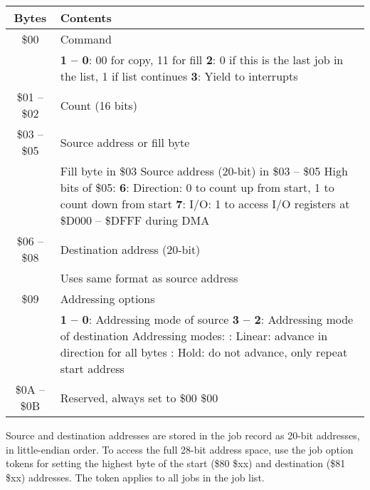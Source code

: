 \begin{center}
\begin{tabular}{|c|p{6cm}|}
\hline
{\bf Bytes} & {\bf Contents} \\
\hline

\$00 & Command \\
& {\bf 1 -- 0}: 00 for copy, 11 for fill \newline
{\bf 2}: 0 if this is the last job in the list, 1 if list continues \newline
{\bf 3}: Yield to interrupts \\
\hline

\$01 -- \$02 & Count (16 bits) \\
\hline

\$03 -- \$05 & Source address or fill byte \\
& Fill byte in \$03 \newline
Source address (20-bit) in \$03 -- \$05 \newline
High bits of \$05: \newline
{\bf 6}: Direction: 0 to count up from start, 1 to count down from start \newline
{\bf 7}: I/O: 1 to access I/O registers at \$D000 -- \$DFFF during DMA \\
\hline

\$06 -- \$08 & Destination address (20-bit) \\
& Uses same format as source address \\
\hline

\$09 & Addressing options \\
& {\bf 1 -- 0}: Addressing mode of source \newline
{\bf 3 -- 2}: Addressing mode of destination \newline
Addressing modes: \newline
00: Linear: advance in direction for all bytes \newline
10: Hold: do not advance, only repeat start address \\
\hline

\$0A -- \$0B & Reserved, always set to \$00 \$00 \\
\hline

\end{tabular}
\end{center}

Source and destination addresses are stored in the job record as 20-bit
addresses, in little-endian order. To access the full 28-bit address space, use
the job option tokens for setting the highest byte of the start (\$80 \$xx) and
destination (\$81 \$xx) addresses. The token applies to all jobs in the job list.

